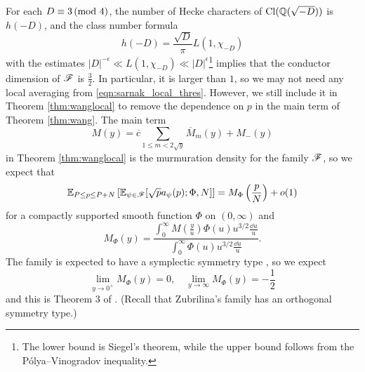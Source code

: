 For each $D \equiv 3 \,(\text{mod }4)$, the number of Hecke characters of $\mathrm{Cl}(\mathbb{Q}(\sqrt{-D}))$ is $h(-D)$, and the class number formula
\[
h(-D) = \frac{\sqrt{D}}{\pi} L(1, \chi_{-D})
\]
with the estimates $|D|^{-\epsilon} \ll L(1, \chi_{-D}) \ll |D|^{\epsilon}$\footnote{The lower bound is Siegel's theorem, while the upper bound follows from the Pólya--Vinogradov inequality.} implies that the conductor dimension of $\mathscr{F}$ is $\frac{3}{2}$.
In particular, it is larger than $1$, so we may not need any local averaging from \eqref{eqn:sarnak_local_thres}.
However, we still include it in Theorem \ref{thm:wanglocal} to remove the dependence on $p$ in the main term of Theorem \ref{thm:wang}.
The main term
\[
M(y) = \overline{c} \sum_{1 \le m < 2 \sqrt{y}} \overline{M}_m(y) + M_-(y)
\]
in Theorem \ref{thm:wanglocal} is the murmuration density for the family $\mathscr{F}$, so we expect that
\begin{equation}
    \mathbb{E}_{P \le p \le P + N}\left[\mathbb{E}_{\psi \in \mathscr{F}} [\sqrt{p} a_\psi(p); \Phi, N]\right] = M_\Phi\left(\frac{p}{N}\right) + o(1)
\end{equation}
for a compactly supported smooth function $\Phi$ on $(0, \infty)$ and
\begin{equation}
    M_\Phi(y) = \frac{\int_0^\infty M\left(\frac{y}{u}\right) \Phi(u) u^{3/2} \frac{\dd u}{u}}{\int_0^\infty \Phi(u) u^{3/2} \frac{\dd u}{u}}.
\end{equation}
The family is expected to have a symplectic symmetry type \cite{fouvry2003low,sarnak2016families}, so we expect
\[
\lim_{y \to 0^+} M_\Phi(y) = 0, \quad \lim_{y \to \infty} M_\Phi(y) = -\frac{1}{2}
\]
and this is Theorem 3 of \cite{wang2025murmurations}.
(Recall that Zubrilina's family has an orthogonal symmetry type.)
